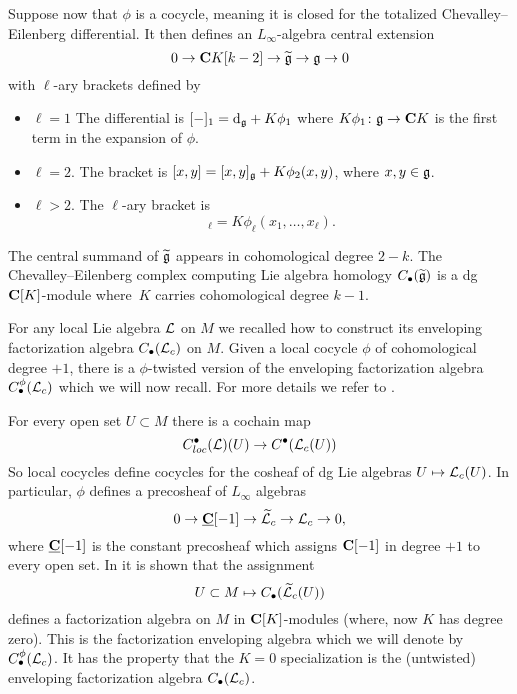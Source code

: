\documentclass[11pt]{amsart}
\begin{document}
Suppose now that $\phi$ is a cocycle, meaning it is closed for the totalized Chevalley--Eilenberg differential.
It then defines an $L_\infty$-algebra central extension
\begin{equation}
0 \to \mathbf{C} K [k-2] \to  \widetilde{\mathfrak{g}} \to \mathfrak{g} \to 0
\end{equation}
with $\ell$-ary brackets defined by
\begin{itemize}
\item $\ell = 1$
The differential is $[-]_1 = {\rm d}_{\mathfrak{g}} + K \phi_1$ where $K \phi_1 \colon \mathfrak{g} \to \mathbf{C} K$ is the first term in the expansion of $\phi$.
\item $\ell=2$. 
The bracket is $[x,y] = [x,y]_{\mathfrak{g}} + K \phi_2(x,y)$, where $x,y \in \mathfrak{g}$.
\item $\ell > 2$.
The $\ell$-ary bracket is
\begin{equation}
[x_1,\ldots,x_\ell]_\ell = K \phi_\ell(x_1,\ldots,x_\ell) .
\end{equation}
\end{itemize}
The central summand of $\widetilde{\mathfrak{g}}$ appears in cohomological degree $2-k$. 
The Chevalley--Eilenberg complex computing Lie algebra homology $C_\bullet(\widetilde{\mathfrak{g}})$ is a dg $\mathbf{C}[K]$-module where~$K$ carries cohomological degree $k-1$.


For any local Lie algebra $\mathcal L$ on $M$ we recalled how to construct its enveloping factorization algebra $C_\bullet(\mathcal L_c)$ on $M$.
Given a local cocycle $\phi$ of cohomological degree $+1$, there is a $\phi$-twisted version of the enveloping factorization algebra $C_\bullet^\phi(\mathcal L_c)$ which we will now recall. 
For more details we refer to \cite[\S 11]{CG2}.

For every open set $U \subset M$ there is a cochain map
\begin{equation}
C^\bullet_{loc}(\mathcal L)(U) \to C^\bullet(\mathcal L_c(U))
\end{equation}
So local cocycles define cocycles for the cosheaf of dg Lie algebras $U \mapsto \mathcal L_c(U)$.
In particular, $\phi$ defines a precosheaf of $L_\infty$ algebras
\begin{equation}
0 \to \smash{\underline{\mathbf{C}}}[-1] \to \widetilde {\mathcal L}_c \to \mathcal L_c \to 0 ,
\end{equation}
where $\smash{\underline{\mathbf{C}}}[-1]$ is the constant precosheaf which assigns $\mathbf{C}[-1]$ in degree $+1$ to every open set.
In \cite{CG2} it is shown that the assignment
\begin{equation}
U \subset M \mapsto C_\bullet(\widetilde {\mathcal L}_c (U)) 
\end{equation}
defines a factorization algebra on $M$ in $\mathbf{C}[K]$-modules (where, now $K$ has degree zero).
This is the  factorization enveloping algebra which we will denote by $C^\phi_\bullet(\mathcal L_c)$.
It has the property that the $K=0$ specialization is the (untwisted) enveloping factorization algebra $C_\bullet(\mathcal L_c)$.
\end{document}

